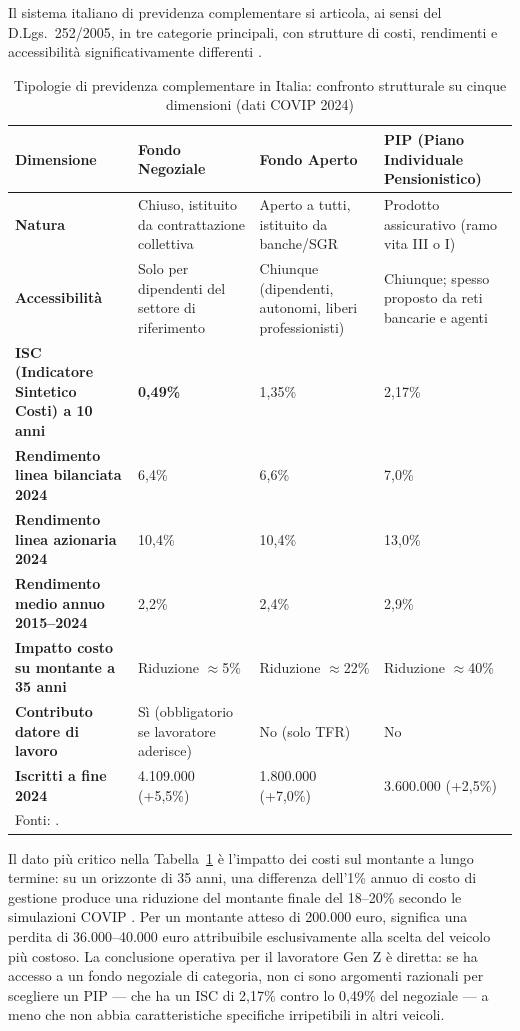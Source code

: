\noindent
Il sistema italiano di previdenza complementare si articola, ai sensi
del D.Lgs.\ 252/2005, in tre categorie principali, con strutture
di costi, rendimenti e accessibilità significativamente differenti
\cite{COVIP2025}.

\begin{table}[h!]
\centering
\small
\caption{Tipologie di previdenza complementare in Italia: confronto
         strutturale su cinque dimensioni (dati COVIP 2024)}
\label{tab:tipologie_fondi}
\begin{tabular}{p{2.8cm} p{3.5cm} p{3.5cm} p{3.5cm}}
\toprule
\textbf{Dimensione}
& \textbf{Fondo Negoziale}
& \textbf{Fondo Aperto}
& \textbf{PIP (Piano Individuale Pensionistico)} \\
\midrule
\textbf{Natura}
& Chiuso, istituito da contrattazione collettiva
& Aperto a tutti, istituito da banche/SGR
& Prodotto assicurativo (ramo vita III o I) \\
\addlinespace
\textbf{Accessibilità}
& Solo per dipendenti del settore di riferimento
& Chiunque (dipendenti, autonomi, liberi professionisti)
& Chiunque; spesso proposto da reti bancarie e agenti \\
\addlinespace
\textbf{ISC (Indicatore Sintetico Costi) a 10 anni}
& \textbf{0,49\%}
& 1,35\%
& 2,17\% \\
\addlinespace
\textbf{Rendimento linea bilanciata 2024}
& 6,4\%
& 6,6\%
& 7,0\% \\
\addlinespace
\textbf{Rendimento linea azionaria 2024}
& 10,4\%
& 10,4\%
& 13,0\% \\
\addlinespace
\textbf{Rendimento medio annuo 2015--2024}
& 2,2\%
& 2,4\%
& 2,9\% \\
\addlinespace
\textbf{Impatto costo su montante a 35 anni}
& Riduzione $\approx$5\%
& Riduzione $\approx$22\%
& Riduzione $\approx$40\% \\
\addlinespace
\textbf{Contributo datore di lavoro}
& Sì (obbligatorio se lavoratore aderisce)
& No (solo TFR)
& No \\
\addlinespace
\textbf{Iscritti a fine 2024}
& 4.109.000 (+5,5\%)
& 1.800.000 (+7,0\%)
& 3.600.000 (+2,5\%) \\
\bottomrule
\multicolumn{4}{l}{\small Fonti: \cite{COVIP2025, web:65, web:80}.}
\end{tabular}
\end{table}

\noindent
Il dato più critico nella Tabella~\ref{tab:tipologie_fondi} è l'impatto
dei costi sul montante a lungo termine: su un orizzonte di 35 anni,
una differenza dell'1\% annuo di costo di gestione produce una
riduzione del montante finale del 18--20\% secondo le simulazioni COVIP
\cite{web:80}.
Per un montante atteso di 200.000 euro, significa una perdita di
36.000--40.000 euro attribuibile esclusivamente alla scelta del
veicolo più costoso.
La conclusione operativa per il lavoratore Gen Z è diretta:
se ha accesso a un fondo negoziale di categoria, non ci sono argomenti
razionali per scegliere un PIP — che ha un ISC di 2,17\% contro lo
0,49\% del negoziale — a meno che non abbia caratteristiche specifiche
irripetibili in altri veicoli.

